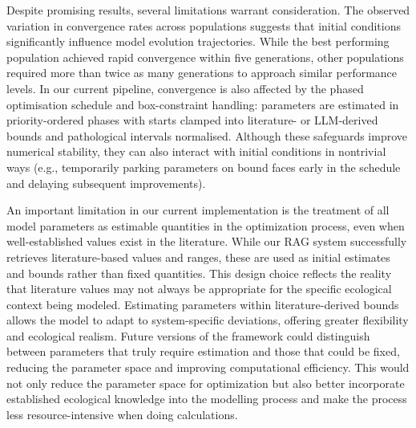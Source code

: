 Despite promising results, several limitations warrant consideration. The observed variation in convergence rates across populations suggests that initial conditions significantly influence model evolution trajectories. While the best performing population achieved rapid convergence within five generations, other populations required more than twice as many generations to approach similar performance levels. In our current pipeline, convergence is also affected by the phased optimisation schedule and box-constraint handling: parameters are estimated in priority-ordered phases with starts clamped into literature- or LLM-derived bounds and pathological intervals normalised. Although these safeguards improve numerical stability, they can also interact with initial conditions in nontrivial ways (e.g., temporarily parking parameters on bound faces early in the schedule and delaying subsequent improvements).

An important limitation in our current implementation is the treatment of all model parameters as estimable quantities in the optimization process, even when well-established values exist in the literature. While our RAG system successfully retrieves literature-based values and ranges, these are used as initial estimates and bounds rather than fixed quantities. This design choice reflects the reality that literature values may not always be appropriate for the specific ecological context being modeled. Estimating parameters within literature-derived bounds allows the model to adapt to system-specific deviations, offering greater flexibility and ecological realism. Future versions of the framework could distinguish between parameters that truly require estimation and those that could be fixed, reducing the parameter space and improving computational efficiency. This would not only reduce the parameter space for optimization but also better incorporate established ecological knowledge into the modelling process and make the process less resource-intensive when doing calculations.

